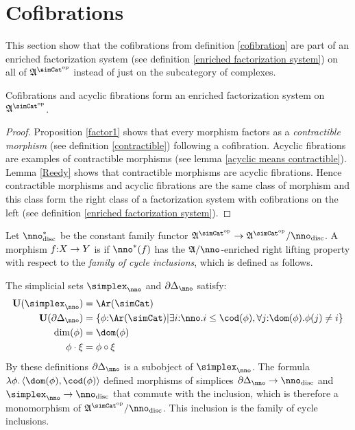 \documentclass[csh.tex]{subfiles}
\begin{document}
\section{Cofibrations}
This section show that the cofibrations from definition \ref{cofibration} are part of an enriched factorization system (see definition \ref{enriched factorization system}) on all of $\ambient\s$ instead of just on the subcategory of complexes.

\begin{lemma} Cofibrations and acyclic fibrations form an enriched factorization system on $\ambient\s$. \label{factorization system 1} \end{lemma}

\begin{proof} Proposition \ref{factor1} shows that every morphism factors as a \emph{contractible morphism} (see definition \ref{contractible}) following a cofibration. Acyclic fibrations are examples of contractible morphisms (see lemma \ref{acyclic means contractible}). Lemma \ref{Reedy} shows that contractible morphisms are acyclic fibrations. Hence contractible morphisms and acyclic fibrations are the same class of morphism and this class form the right class of a factorization system with cofibrations on the left (see definition \ref{enriched factorization system}).
\end{proof}

\begin{definition} Let $\nno\disc\ri$ be the constant family functor $\ambient\s\to\ambient\s/\nno\disc$. 
A morphism $f\mathord : X\to Y$ is  if $\nno\ri(f)$ has the $\ambient/\nno$-enriched right lifting property with respect to the \emph{family of cycle inclusions}, which is defined as follows.

The simplicial sets $\simplex_\nno$ and $\cycle_\nno$ satisfy:
\begin{align*}
\base(\simplex_\nno) &= \Ar(\simCat) \\
\base(\cycle_\nno) &= \set{\phi\of\Ar(\simCat)\middle|\exists i\of\nno.i\leq \cod(\phi),\forall j\of \dom(\phi).\phi(j)\neq i} \\
\dim(\phi) &= \dom(\phi) \\
\phi\cdot \xi &=\phi\circ\xi
\end{align*}
By these definitions $\cycle_\nno$ is a subobject of $\simplex_\nno$. The formula $\function{\phi}\tuplet{\dom(\phi),\cod(\phi)}$ defined morphisms of simplices $\cycle_\nno\to \nno\disc$ and $\simplex_\nno\to \nno\disc$ that commute with the inclusion, which is therefore a monomorphism of $\ambient\s/\nno\disc$. This inclusion is the family of cycle inclusions.
\end{definition}
\end{document}
